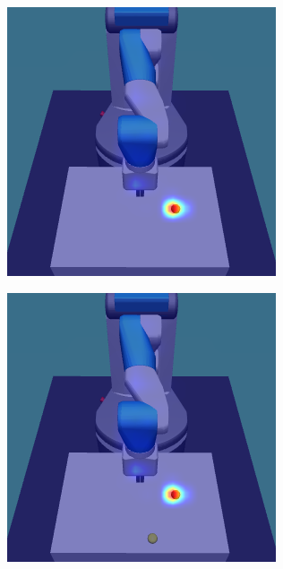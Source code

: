\begin{figure}[h!]
  \begin{subfigure}{0.24\columnwidth}
    \includegraphics[width=\linewidth]{figures/chapter6/distractor_saliency_fetch_pro_off/standard_visual_random}
  \end{subfigure}
  \begin{subfigure}{0.24\columnwidth}
    \includegraphics[width=\linewidth]{figures/chapter6/distractor_saliency_fetch_pro_off/color_visual_random}

\end{subfigure}
\end{figure}
